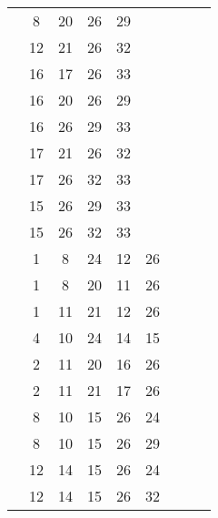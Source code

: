 \begin{table}[H]
\begin{tabular}{|c|cccccccc|}
 & 8 & 20 & 26 & 29 &   &   &   &  \\
 & 12 & 21 & 26 & 32 &   &   &   &  \\
 & 16 & 17 & 26 & 33 &   &   &   &  \\
 & 16 & 20 & 26 & 29 &   &   &   &  \\
 & 16 & 26 & 29 & 33 &   &   &   &  \\
 & 17 & 21 & 26 & 32 &   &   &   &  \\
 & 17 & 26 & 32 & 33 &   &   &   &  \\
 & 15 & 26 & 29 & 33 &   &   &   &  \\
 & 15 & 26 & 32 & 33 &   &   &   &  \\
 & 1 & 8 & 24 & 12 & 26 &   &   &  \\
 & 1 & 8 & 20 & 11 & 26 &   &   &  \\
 & 1 & 11 & 21 & 12 & 26 &   &   &  \\
 & 4 & 10 & 24 & 14 & 15 &   &   &  \\
 & 2 & 11 & 20 & 16 & 26 &   &   &  \\
 & 2 & 11 & 21 & 17 & 26 &   &   &  \\
 & 8 & 10 & 15 & 26 & 24 &   &   &  \\
 & 8 & 10 & 15 & 26 & 29 &   &   &  \\
 & 12 & 14 & 15 & 26 & 24 &   &   &  \\
 & 12 & 14 & 15 & 26 & 32 &   &   &  \\
\end{tabular}
\end{table}
